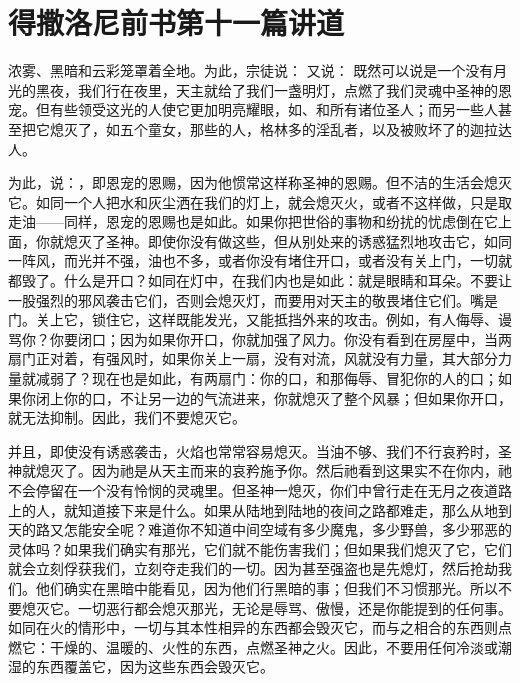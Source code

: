 \section{得撒洛尼前书第十一篇讲道}

\par

\par

浓雾、黑暗和云彩笼罩着全地。为此，宗徒说： 又说： 既然可以说是一个没有月光的黑夜，我们行在夜里，天主就给了我们一盏明灯，点燃了我们灵魂中圣神的恩宠。但有些领受这光的人使它更加明亮耀眼，如、和所有诸位圣人；而另一些人甚至把它熄灭了，如五个童女，那些的人，格林多的淫乱者，以及被败坏了的迦拉达人。\par

为此，说：，即恩宠的恩赐，因为他惯常这样称圣神的恩赐。但不洁的生活会熄灭它。如同一个人把水和灰尘洒在我们的灯上，就会熄灭火，或者不这样做，只是取走油——同样，恩宠的恩赐也是如此。如果你把世俗的事物和纷扰的忧虑倒在它上面，你就熄灭了圣神。即使你没有做这些，但从别处来的诱惑猛烈地攻击它，如同一阵风，而光并不强，油也不多，或者你没有堵住开口，或者没有关上门，一切就都毁了。什么是开口？如同在灯中，在我们内也是如此：就是眼睛和耳朵。不要让一股强烈的邪风袭击它们，否则会熄灭灯，而要用对天主的敬畏堵住它们。嘴是门。关上它，锁住它，这样既能发光，又能抵挡外来的攻击。例如，有人侮辱、谩骂你？你要闭口；因为如果你开口，你就加强了风力。你没有看到在房屋中，当两扇门正对着，有强风时，如果你关上一扇，没有对流，风就没有力量，其大部分力量就减弱了？现在也是如此，有两扇门：你的口，和那侮辱、冒犯你的人的口；如果你闭上你的口，不让另一边的气流进来，你就熄灭了整个风暴；但如果你开口，就无法抑制。因此，我们不要熄灭它。\par

并且，即使没有诱惑袭击，火焰也常常容易熄灭。当油不够、我们不行哀矜时，圣神就熄灭了。因为祂是从天主而来的哀矜施予你。然后祂看到这果实不在你内，祂不会停留在一个没有怜悯的灵魂里。但圣神一熄灭，你们中曾行走在无月之夜道路上的人，就知道接下来是什么。如果从陆地到陆地的夜间之路都难走，那么从地到天的路又怎能安全呢？难道你不知道中间空域有多少魔鬼，多少野兽，多少邪恶的灵体吗？如果我们确实有那光，它们就不能伤害我们；但如果我们熄灭了它，它们就会立刻俘获我们，立刻夺走我们的一切。因为甚至强盗也是先熄灯，然后抢劫我们。他们确实在黑暗中能看见，因为他们行黑暗的事；但我们不习惯那光。所以不要熄灭它。一切恶行都会熄灭那光，无论是辱骂、傲慢，还是你能提到的任何事。如同在火的情形中，一切与其本性相异的东西都会毁灭它，而与之相合的东西则点燃它：干燥的、温暖的、火性的东西，点燃圣神之火。因此，不要用任何冷淡或潮湿的东西覆盖它，因为这些东西会毁灭它。\par

